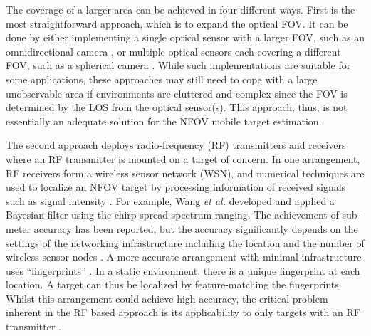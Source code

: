 The coverage of a larger area can be achieved in four different ways.  First is the most straightforward approach, which is to expand the optical FOV.  It can be done by either implementing a single optical sensor with a larger FOV, such as an omnidirectional camera \cite{kobilarov2006,nayar1997}, or multiple optical sensors each covering a different FOV, such as a spherical camera \cite{Jankovic2005}.  While such implementations are suitable for some applications, these approaches may still need to cope with  a large unobservable area if environments are cluttered and complex since the FOV is determined by the LOS from the optical sensor(s).  This approach, thus, is not essentially an adequate solution for the NFOV mobile target estimation.  

The second approach deploys radio-frequency (RF) transmitters and receivers where an RF transmitter is mounted on a target of concern.  In one arrangement, RF receivers form a wireless sensor network (WSN), and numerical techniques are used to localize an NFOV target by processing information of received signals such as signal intensity \cite{Bertinato2008,Dai2012,Ni2004,Zhang2010,Liu2007,Gezici2008,Guvenc2009}.  For example, Wang \textit{et al.} \cite{Wang2012} developed and applied a Bayesian filter using the chirp-spread-spectrum ranging.  The achievement of sub-meter accuracy has been reported, but the accuracy significantly depends on the settings of the networking infrastructure including the location and the number of wireless sensor nodes \cite{Jung2011,Gao2013}.  A more accurate arrangement with minimal infrastructure uses ``fingerprints'' \cite{Bahl2000,lad04}.  In a static environment, there is a unique fingerprint at each location.  A target can thus be localized by feature-matching the fingerprints.  Whilst this arrangement could achieve high accuracy, the critical problem inherent in the RF based approach is its applicability to only targets with an RF transmitter \cite{Chen1999,Prigge2004,Seow2008,Khoury2009}. 

